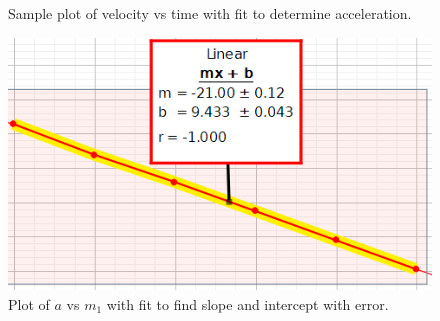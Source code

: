 \documentclass[12pt]{article}
\begin{document}
\begin{center}
\begin{figure}[H]
            \caption{Sample plot of velocity vs time with fit to determine acceleration.}
        \end{figure}
        \begin{figure}[H]
            \centering
            \includegraphics{Acceleration vs m1.png}
            \caption{Plot of \(a\) vs \(m_1\) with fit to find slope and intercept with error.}
        \end{figure}
    \end{center}
\end{document}
